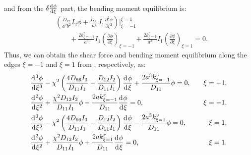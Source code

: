 \documentclass[preprint,12pt,number]{elsarticle}
\newcommand{\id}{\mathrm{d}\mkern1mu}
\begin{document}
%
and from the $\delta \frac{\id \phi}{\id \xi}$ part, the bending moment equilibrium is:
%
\begin{equation}\label{eq:inertial_forcex2}
\begin{split}	
	&\left( \frac{D_{12}}{a^2b^2} I_2 \phi + \frac{D_{11}}{a^4} I_1 \frac{\partial^2 \phi}{\partial \xi^2} \right) 
	\Big|^{\xi=1}_{\xi=-1} \\
	&\qquad + \frac{2k^r_{\xi=-1}}{a^3} I_1 \left(\frac{\partial \phi}{\partial \xi}\right)_{\xi=-1}
	+ \frac{2k^r_{\xi=1}}{a^3} I_1 \left(\frac{\partial \phi}{\partial \xi}\right)_{\xi=1} = 0.
\end{split}
\end{equation}
%
Thus, we can obtain the shear force and bending moment equilibrium along the edges $\xi = -1$ and $\xi = 1$ from , respectively, as:
%
\begin{subequations}\label{eq:boundaryx}
\begin{align}
	&  \frac{\id^3 \phi}{\id \xi^3} - \chi^2\left( \frac{4D_{66}I_3}{D_{11}I_1}  - \frac{D_{12}I_2}{D_{11}I_1}  \right) \frac{\id \phi}{\id \xi} 
	+\frac{2a^3k^v_{\xi=-1}}{D_{11}}\phi = 0, \quad &\xi = -1, \\
	& \frac{\id^2 \phi}{\id \xi^2} + \frac{\chi^2 D_{12} I_2}{D_{11} I_1} \phi - \frac{2a k^r_{\xi=-1}}{D_{11}} \frac{\id \phi}{\id \xi} = 0, \quad &\xi = -1, \\
	& \frac{\id^3 \phi}{\id \xi^3} - \chi^2\left( \frac{4D_{66}I_3}{D_{11}I_1}  - \frac{D_{12}I_2}{D_{11}I_1}  \right) \frac{\id \phi}{\id \xi} 
	-\frac{2a^3 k^v_{\xi=1}}{D_{11}} \phi = 0, \quad &\xi = 1, \\
	& \frac{\id^2 \phi}{\id \xi^2} + \frac{\chi^2 D_{12} I_2}{D_{11} I_1} \phi + \frac{2a k^r_{\xi=1}}{D_{11}} \frac{\id \phi}{\id \xi} = 0, \quad &\xi = 1.
\end{align}
\end{subequations}
\end{document}
